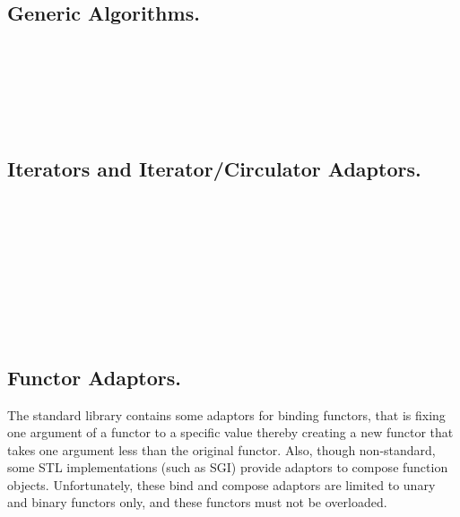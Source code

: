 \\
\\
 
\subsection*{Generic Algorithms.}

\\
\\
\\
\\
\\

\subsection*{Iterators and Iterator/Circulator Adaptors.}

\\
\\
\\
\\
\\
\\
\\
\\

\subsection*{Functor Adaptors.}

The standard library contains some adaptors for binding functors, that
is fixing one argument of a functor to a specific value thereby
creating a new functor that takes one argument less than the original
functor.  Also, though non-standard, some STL implementations (such as
SGI) provide adaptors to compose function objects. Unfortunately,
these bind and compose adaptors are limited to unary and binary
functors only, and these functors must not be overloaded.

